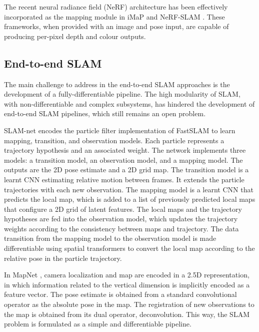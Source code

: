 The recent  neural radiance field (NeRF) architecture \cite{mildenhall2021nerf} has been effectively incorporated as the mapping module in iMaP \cite{sucar2021imap} and NeRF-SLAM \cite{RW:nerfslam}. These frameworks, when provided with an image and pose input, are capable of producing per-pixel depth and colour outputs.


\subsection{End-to-end SLAM}
\label{sec:deeplearning:endSLAM}

The main challenge to address in the end-to-end SLAM approaches is the development of a fully-differentiable pipeline. The high modularity of SLAM, with non-differentiable and complex subsystems, has hindered the development of end-to-end SLAM pipelines, which still remains an open problem. 

SLAM-net \cite{karkus2021SLAM-Net} encodes the particle filter implementation of FastSLAM \cite{montemerlo2002fastslam} to learn mapping, transition, and observation models. Each particle represents a trajectory hypothesis and an associated weight.
The network implements three models: a transition model, an observation model, and a mapping model. The outputs are the 2D pose estimate and a 2D grid map.
The transition model is a learnt CNN estimating relative motion between frames. It extends the particle trajectories with each new observation.
The mapping model is a learnt CNN that predicts the local map, which is added to a list of previously predicted local maps that configure a 2D grid of latent features.
The local maps and the trajectory hypotheses are fed into the observation model, which updates the trajectory weights according to the consistency between maps and trajectory.
The data transition from the mapping model to the observation model is made differentiable using spatial transformers \cite{jaderberg2015spatialtransformers} to convert the local map according to the relative pose in the particle trajectory.

In MapNet \cite{henriques2018mapnet}, camera localization and map are encoded in a 2.5D representation, in which information related to
the vertical dimension is implicitly encoded as a feature vector. The pose estimate is obtained from a standard convolutional operator as the absolute pose in the map. The registration of new observations to the map is obtained from its dual
operator, deconvolution. This way, the SLAM problem is formulated as a simple and differentiable pipeline. 

